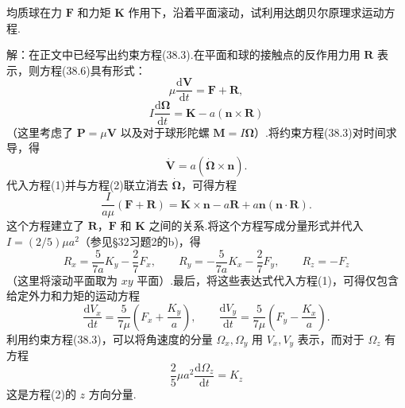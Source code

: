 \begin{xiti}

\quad 均质球在力 $\boldsymbol{F}$ 和力矩 $\boldsymbol{K}$ 作用下，沿着平面滚动，试利用达朗贝尔原理求运动方程.

解：在正文中已经写出约束方程(38.3).在平面和球的接触点的反作用力用 $\boldsymbol{R}$ 表示，则方程(38.6)具有形式：
\begin{equation*}
  \mu\frac{\mathrm{d}\boldsymbol{V}}{\mathrm{d}t}
  =\boldsymbol{F}+\boldsymbol{R},
  \tag{1}
\end{equation*}
\begin{equation*}
  I\frac{\mathrm{d}\boldsymbol{\Omega}}{\mathrm{d}t}
  =\boldsymbol{K}-a\left(\boldsymbol{n}\times\boldsymbol{R}\right)
  \tag{2}
\end{equation*}
（这里考虑了 $\boldsymbol{P}=\mu\boldsymbol{V}$ 以及对于球形陀螺
$\boldsymbol{M}=I\boldsymbol{\Omega}$）.将约束方程(38.3)对时间求导，得
\begin{equation*}
  \dot{\boldsymbol{V}}=a\left(\dot{\boldsymbol{\Omega}}\times\boldsymbol{n}\right).
\end{equation*}
代入方程(1)并与方程(2)联立消去 $\dot{\boldsymbol{\Omega}}$，可得方程
\begin{equation*}
  \frac{I}{a\mu}\left(\boldsymbol{F}+\boldsymbol{R}\right)
  =\boldsymbol{K}\times\boldsymbol{n}
  -a\boldsymbol{R}
  +a\boldsymbol{n}\left(\boldsymbol{n}\cdot\boldsymbol{R}\right).
\end{equation*}
这个方程建立了 $\boldsymbol{R}$，$\boldsymbol{F}$ 和 $\boldsymbol{K}$ 之间的关系.将这个方程写成分量形式并代入
$I=(2/5)\mu a^2$（参见§32习题2的b)，得
\begin{equation*}
  R_x=\frac{5}{7a}K_y-\frac{2}{7}F_x,\qquad
  R_y=-\frac{5}{7a}K_x-\frac{2}{7}F_y,\qquad
  R_z=-F_z
\end{equation*}
（这里将滚动平面取为 $xy$ 平面）.最后，将这些表达式代入方程(1)，可得仅包含给定外力和力矩的运动方程
\begin{equation*}
  \frac{\mathrm{d}V_x}{\mathrm{d}t}
  =\frac{5}{7\mu}\left(F_x+\frac{K_y}{a}\right),\qquad
  \frac{\mathrm{d}V_y}{\mathrm{d}t}
  =\frac{5}{7\mu}\left(F_y-\frac{K_x}{a}\right).
\end{equation*}
利用约束方程(38.3)，可以将角速度的分量 $\Omega_x,\Omega_y$ 用 $V_x,V_y$ 表示，而对于 $\Omega_z$ 有方程
\begin{equation*}
  \frac{2}{5}\mu a^2\frac{\mathrm{d}\Omega_z}{\mathrm{d}t}=K_z
\end{equation*}
这是方程(2)的 $z$ 方向分量.


\end{xiti}
